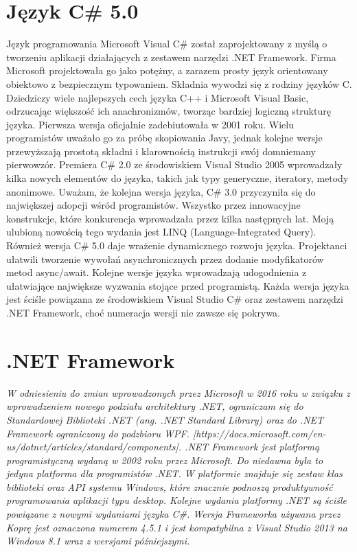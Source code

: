 \documentclass[a4paper,twoside,titlepage,openright]{book}
\begin{document}
\section{Język C\# 5.0}
Język programowania Microsoft Visual C\# został zaprojektowany z myślą o tworzeniu aplikacji działających z zestawem narzędzi .NET Framework. Firma Microsoft projektowała go jako potężny, a zarazem prosty język orientowany obiektowo z bezpiecznym typowaniem. \cite{csharp} Składnia wywodzi się z rodziny języków C. Dziedziczy wiele najlepszych cech języka C++ i Microsoft Visual Basic, odrzucając większość ich anachronizmów, tworząc bardziej logiczną strukturę języka. Pierwsza wersja oficjalnie zadebiutowała w 2001 roku. Wielu programistów uważało go za próbę skopiowania Javy, jednak kolejne wersje przewyższają prostotą składni i klarownością instrukcji swój domniemany pierwowzór. Premiera C\# 2.0 ze środowiskiem Visual Studio 2005 wprowadzały kilka nowych elementów do języka, takich jak typy generyczne, iteratory, metody anonimowe. Uważam, że kolejna wersja języka, C\# 3.0 przyczyniła się do największej adopcji wśród programistów. Wszystko przez innowacyjne konstrukcje, które konkurencja wprowadzała przez kilka następnych lat. Moją ulubioną nowością tego wydania jest LINQ (Language-Integrated Query). Również wersja C\# 5.0 daje wrażenie dynamicznego rozwoju języka. Projektanci ułatwili tworzenie wywołań asynchronicznych przez dodanie modyfikatorów metod async/await. Kolejne wersje języka wprowadzają udogodnienia z ułatwiające największe wyzwania stojące przed programistą. Każda wersja języka jest ściśle powiązana ze środowiskiem Visual Studio C\# oraz zestawem narzędzi .NET Framework, choć numeracja wersji nie zawsze się pokrywa.

\section{.NET Framework}
{\color{red}\textit{W odniesieniu do zmian wprowadzonych przez Microsoft w 2016 roku w związku z wprowadzeniem nowego podziału architektury .NET, ograniczam się do Standardowej Biblioteki .NET (ang. .NET Standard Library) oraz do .NET Framework ograniczony do podzbioru WPF. [https://docs.microsoft.com/en-us/dotnet/articles/standard/components].
.NET Framework jest platformą programistyczną wydaną w 2002 roku przez Microsoft. Do niedawna była to jedyna platforma dla programistów .NET. W platformie znajduje się zestaw klas biblioteki oraz API systemu Windows, które znacznie podnoszą produktywność programowania aplikacji typu desktop. Kolejne wydania platformy .NET są ściśle powiązane z nowymi wydaniami języka C\#. Wersja Frameworka używana przez Koprę jest oznaczona numerem 4.5.1  i jest kompatybilna z Visual Studio 2013 na Windows 8.1 wraz z wersjami późniejszymi. }}
\end{document}

